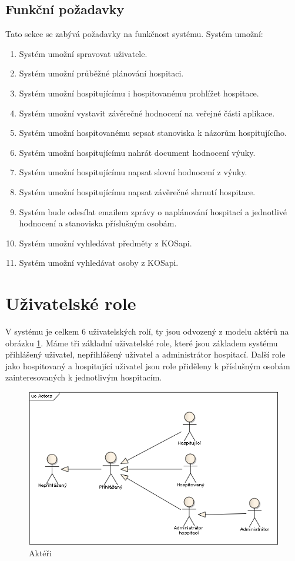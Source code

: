 \subsection{Funkční požadavky}
Tato sekce se zabývá požadavky na funkčnost systému. Systém umožní:
\begin{enumerate}
\item Systém umožní spravovat uživatele.
\item Systém umožní průběžné plánování hospitaci.
\item Systém umožní hospitujícímu i hospitovanému prohlížet hospitace.
\item Systém umožní vystavit závěrečné hodnocení na veřejné části aplikace. 
\item Systém umožní hospitovanému sepsat stanoviska k názorům hospitujícího.
\item Systém umožní hospitujícímu nahrát document hodnocení výuky.
\item Systém umožní hospitujícímu napsat slovní hodnocení z výuky.
\item Systém umožní hospitujícímu napsat závěrečné shrnutí hospitace.
\item Systém bude odesílat emailem zprávy o naplánování hospitací a jednotlivé hodnocení a stanoviska příslušným osobám.
\item Systém umožní vyhledávat předměty z KOSapi.
\item Systém umožní vyhledávat osoby z KOSapi.
\end{enumerate}

\section{Uživatelské role}
V systému je celkem 6 uživatelských rolí, ty jsou odvozený z modelu aktérů na obrázku \ref{fig:actors}. Máme tři základní uživatelské role, které jsou základem systému přihlášený uživatel, nepřihlášený uživatel a administrátor hospitací. Další role jako hospitovaný a hospitující uživatel jsou role přiděleny k příslušným osobám zainteresovaných k jednotlivým hospitacím.

\begin{figure}[h]
\begin{center}
\includegraphics[width=16cm]{figures/Actors}
\caption{Aktéři}
\label{fig:actors}
\end{center}
\end{figure}

